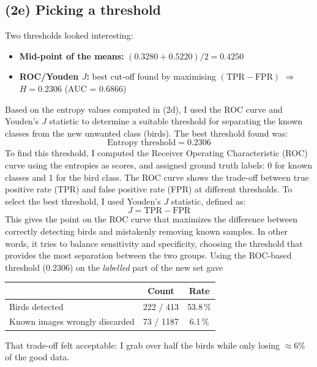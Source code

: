 \documentclass[10pt]{article}
\begin{document}
\subsection*{(2e) Picking a threshold}

Two thresholds looked interesting:

\begin{itemize}
  \item \textbf{Mid-point of the means:} $(0.3280 + 0.5220)/2 = 0.4250$
  \item \textbf{ROC/Youden $J$:} best cut-off found by maximising $(\text{TPR}-\text{FPR})$  
        $\Rightarrow$ \textbf{$H=0.2306$} (AUC = 0.6866)
\end{itemize}
Based on the entropy values computed in (2d), I used the ROC curve and Youden's $J$ statistic to determine a suitable threshold for separating the known classes from the new unwanted class (birds). The best threshold found was:
\[
\text{Entropy threshold} = 0.2306
\]
To find this threshold, I computed the Receiver Operating Characteristic (ROC) curve using the entropies as scores, and assigned ground truth labels: 0 for known classes and 1 for the bird class. The ROC curve shows the trade-off between true positive rate (TPR) and false positive rate (FPR) at different thresholds. To select the best threshold, I used Youden’s $J$ statistic, defined as:
\[
J = \text{TPR} - \text{FPR}
\]
This gives the point on the ROC curve that maximizes the difference between correctly detecting birds and mistakenly removing known samples. In other words, it tries to balance sensitivity and specificity, choosing the threshold that provides the most separation between the two groups.
Using the ROC-based threshold ($0.2306$) on the \emph{labelled} part of the new set gave
\begin{center}
\begin{tabular}{lcc}
\toprule
                                 & Count & Rate \\
\midrule
Birds detected                   & 222 / 413 & 53.8\,\% \\
Known images wrongly discarded   &  73 / 1187 &  6.1\,\% \\
\bottomrule
\end{tabular}
\end{center}

That trade-off felt acceptable: I grab over half the birds while only losing $\approx6\%$ of the good data.

\end{document}
